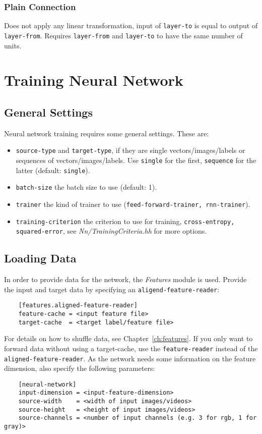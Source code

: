 \subsubsection*{Plain Connection}

Does not apply any linear transformation, \ie input of \texttt{layer-to} is equal to output of \texttt{layer-from}. Requires \texttt{layer-from} and \texttt{layer-to} to have the same number of units.


\section{Training Neural Network}

\subsection{General Settings}

Neural network training requires some general settings. These are:
\begin{itemize}
    \item \texttt{source-type} and \texttt{target-type}, \ie if they are single vectors/images/labels or sequences of vectors/images/labels. Use \texttt{single} for the first, \texttt{sequence} for the latter (default: \texttt{single}).
    \item \texttt{batch-size} the batch size to use (default: 1).
    \item \texttt{trainer} the kind of trainer to use (\texttt{feed-forward-trainer, rnn-trainer}).
    \item \texttt{training-criterion} the criterion to use for training, \eg \texttt{cross-entropy, squared-error}, see \textit{Nn/TrainingCriteria.hh} for more options.
\end{itemize}

\subsection{Loading Data}

In order to provide data for the network, the \textit{Features} module is used. Provide the input and target data by specifying an \texttt{aligend-feature-reader}:
\begin{verbatim}
    [features.aligned-feature-reader]
    feature-cache = <input feature file>
    target-cache  = <target label/feature file>
\end{verbatim}
For details \eg on how to shuffle data, see Chapter~\ref{ch:features}. If you only want to forward data without using a target-cache, use the \texttt{feature-reader} instead of the \texttt{aligned-feature-reader}. As the network needs some information on the feature dimension, also specify the following parameters:
\begin{verbatim}
    [neural-network]
    input-dimension = <input-feature-dimension>
    source-width    = <width of input images/videos>
    source-height   = <height of input images/videos>
    source-channels = <number of input channels (e.g. 3 for rgb, 1 for gray)>
\end{verbatim}

